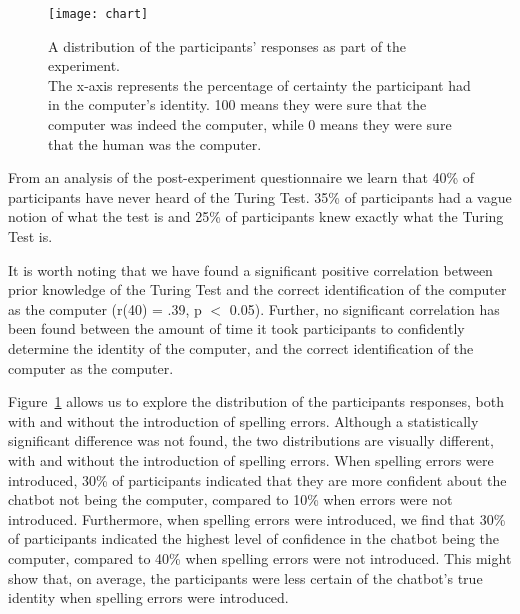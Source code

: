 \begin{figure}[ht]
   \begin{center}
      \texttt{[image: chart]}
   \end{center}
   \caption{A distribution of the participants' responses as part of the experiment.\\
   The x-axis represents the percentage of certainty the participant had in the computer's identity. 100 means they were sure that the computer was indeed the computer, while 0 means they were sure that the human was the computer.}
   \label{chart}
\end{figure}

From an analysis of the post-experiment questionnaire we learn that 40\% of participants have never heard of the Turing Test. 35\% of participants had a vague notion of what the test is and 25\% of participants knew exactly what the Turing Test is.

It is worth noting that we have found a significant positive correlation between prior knowledge of the Turing Test and the correct identification of the computer as the computer (r(40) = .39, p $<$ 0.05). Further, no significant correlation has been found between the amount of time it took participants to confidently determine the identity of the computer, and the correct identification of the computer as the computer.

Figure~\ref{chart} allows us to explore the distribution of the participants responses, both with and without the introduction of spelling errors. Although a statistically significant difference was not found, the two distributions are visually different, with and without the introduction of spelling errors. When spelling errors were introduced, 30\% of participants indicated that they are more confident about the chatbot not being the computer, compared to 10\% when errors were not introduced. Furthermore, when spelling errors were introduced, we find that 30\% of participants indicated the highest level of confidence in the chatbot being the computer, compared to 40\% when spelling errors were not introduced. This might show that, on average, the participants were less certain of the chatbot's true identity when spelling errors were introduced.
